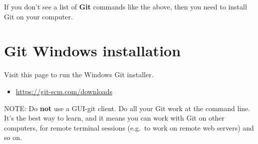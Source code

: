 \documentclass[a4paperpaper,openright]{book}
\providecommand{\tightlist}{%
  \setlength{\itemsep}{0pt}\setlength{\parskip}{0pt}}
\begin{document}
If you don't see a list of \textbf{Git} commands like the above, then
you need to install Git on your computer.

\hypertarget{git-windows-installation}{%
\section{Git Windows installation}\label{git-windows-installation}}

Visit this page to run the Windows Git installer.

\begin{itemize}
\tightlist
\item
  \url{https://git-scm.com/downloads}
\end{itemize}

NOTE: Do \textbf{not} use a GUI-git client. Do all your Git work at the
command line. It's the best way to learn, and it means you can work with
Git on other computers, for remote terminal sessions (e.g.~to work on
remote web servers) and so on.
\end{document}
